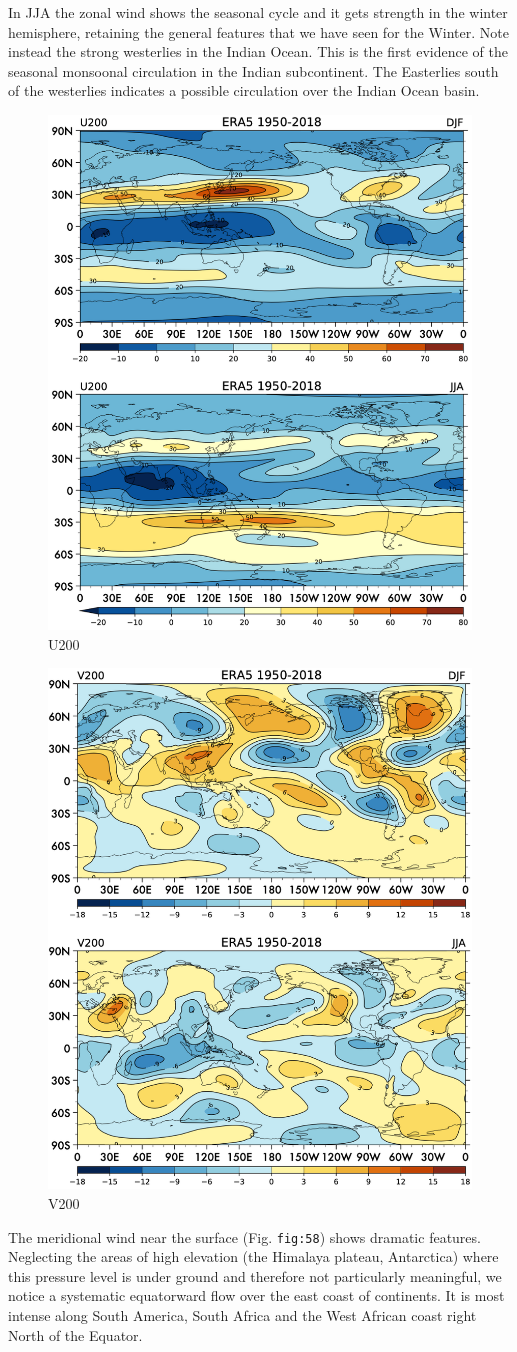 In JJA the zonal wind shows the seasonal cycle and it gets strength in
the winter hemisphere, retaining the general features that we have seen
for the Winter. Note instead the strong westerlies in the Indian Ocean.
This is the first evidence of the seasonal monsoonal circulation in the
Indian subcontinent. The Easterlies south of the westerlies indicates a
possible circulation over the Indian Ocean basin.
\begin{figure}[h!]
    \centering
    \includegraphics[width=0.5\linewidth]{uploads/Screenshot 2024-11-19 132557.png}
    \caption{U200}
    \label{fig:enter-label}
\end{figure}
\begin{figure}[h!]
    \centering
    \includegraphics[width=0.5\linewidth]{uploads/Screenshot 2024-11-19 132652.png}
    \caption{V200}
    \label{fig:enter-label}
\end{figure}


The meridional wind near the surface (Fig. \texttt{fig:58}) shows
dramatic features. Neglecting the areas of high elevation (the Himalaya
plateau, Antarctica) where this pressure level is under ground and
therefore not particularly meaningful, we notice a systematic
equatorward flow over the east coast of continents. It is most intense
along South America, South Africa and the West African coast right North
of the Equator.

